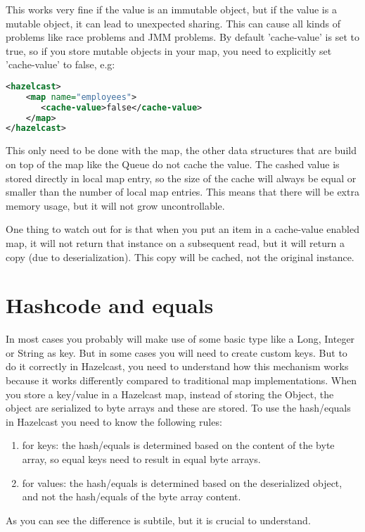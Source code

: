 This works very fine if the value is an immutable object, but if the value is a mutable object, it can lead to unexpected sharing. This can cause all kinds of problems like race problems and JMM problems. By default 'cache-value' is set to true, so if you store mutable objects in your map, you need to explicitly set 'cache-value' to false, e.g:
\begin{lstlisting}[language=xml]
<hazelcast>
    <map name="employees">
       <cache-value>false</cache-value>
    </map>
</hazelcast>
\end{lstlisting}
This only need to be done with the map, the other data structures that are build on top of the map like the Queue do not cache the value. The cashed value is stored directly in local map entry, so the size of the cache will always be equal or smaller than the number of local map entries. This means that there will be extra memory usage, but it will not grow uncontrollable.

One thing to watch out for is that when you put an item in a cache-value enabled map, it will not return that instance on a subsequent read, but it will return a copy (due to deserialization). This copy will be cached, not the original instance.

\section{Hashcode and equals}
In most cases you probably will make use of some basic type like a Long, Integer or String as key. But in some cases you will need to create custom keys. But to do it correctly in Hazelcast, you need to understand how this mechanism works because it works differently compared to traditional map implementations. When you store a key/value in a Hazelcast map, instead of storing the Object, the object are serialized to byte arrays and these are stored. To use the hash/equals in Hazelcast you need to know the following rules:
\begin{enumerate}
\item for keys: the hash/equals is determined based on the content of the byte array, so equal keys need to result in equal byte arrays.
\item for values: the hash/equals is determined based on the deserialized object, and not the hash/equals of the byte array content. 
\end{enumerate}
As you can see the difference is subtile, but it is crucial to understand.

